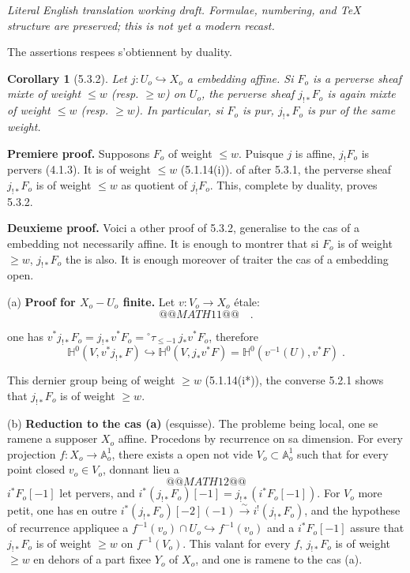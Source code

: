 \documentclass[12pt,a4paper]{article}
\theoremstyle{plain}
\newtheorem{corollary}[theorem]{Corollary}
\theoremstyle{definition}
\theoremstyle{remark}
\newcommand{\HH}{\mathbb{H}}
\begin{document}
\begin{center}\small\emph{Literal English translation working draft. Formulae, numbering, and TeX structure are preserved; this is not yet a modern recast.}\end{center}
\vspace{0.5em}


\setcounter{section}{5}
\setcounter{theorem}{1}

The assertions respees s'obtiennent by duality.

\begin{corollary}[5.3.2]
Let $j: U_o \hookrightarrow X_o$ a embedding affine. Si $F_o$ is a perverse sheaf mixte of weight $\leq w$ (resp. $\geq w$) on $U_o$, the perverse sheaf $j_{!*}F_o$ is again mixte of weight $\leq w$ (resp. $\geq w$). In particular, si $F_o$ is pur, $j_{!*}F_o$ is pur of the same weight.
\end{corollary}

\noindent\textbf{Premiere proof.} Supposons $F_o$ of weight $\leq w$. Puisque $j$ is affine, $j_!F_o$ is pervers (4.1.3). It is of weight $\leq w$ (5.1.14(i)). of after 5.3.1, the perverse sheaf $j_{!*}F_o$ is of weight $\leq w$ as quotient of $j_!F_o$. This, complete by duality, proves 5.3.2.

\medskip
\noindent\textbf{Deuxieme proof.} Voici a other proof of 5.3.2, generalise to the cas of a embedding not necessarily affine. It is enough to montrer that si $F_o$ is of weight $\geq w$, $j_{!*}F_o$ the is also. It is enough moreover of traiter the cas of a embedding open.

\medskip
(a) \textbf{Proof for $X_o - U_o$ finite.} Let $v: V_o \to X_o$ étale:
\[
@@MATH11@@\quad.
\]

one has $v^*j_{!*}F_o = j_{!*}v^*F_o = {}^{\circ}\tau_{\leq -1}\, j_*v^*F_o$, therefore
\[
\HH^0(V, v^*j_{!*}F) \hookrightarrow \HH^0(V, j_*v^*F) = \HH^0(v^{-1}(U), v^*F)\;.
\]

This dernier group being of weight $\geq w$ (5.1.14(i*)), the converse 5.2.1 shows that $j_{!*}F_o$ is of weight $\geq w$.

\medskip
(b) \textbf{Reduction to the cas (a)} (esquisse). The probleme being local, one se ramene a supposer $X_o$ affine. Procedons by recurrence on sa dimension. For every projection $f: X_o \to \mathbb{A}^1_o$, there exists a open not vide $V_o \subset \mathbb{A}^1_o$ such that for every point closed $v_o \in V_o$, donnant lieu a
\[
@@MATH12@@
\]
$i^*F_o[-1]$ let pervers, and $i^*(j_{!*}F_o)[-1] = j_{!*}(i^*F_o[-1])$. For $V_o$ more petit, one has en outre $i^*(j_{!*}F_o)[-2](-1) \xrightarrow{\sim} i^!(j_{!*}F_o)$, and the hypothese of recurrence appliquee a $f^{-1}(v_o) \cap U_o \hookrightarrow f^{-1}(v_o)$ and a $i^*F_o[-1]$ assure that $j_{!*}F_o$ is of weight $\geq w$ on $f^{-1}(V_o)$. This valant for every $f$, $j_{!*}F_o$ is of weight $\geq w$ en dehors of a part fixee $Y_o$ of $X_o$, and one is ramene to the cas (a).
\end{document}
